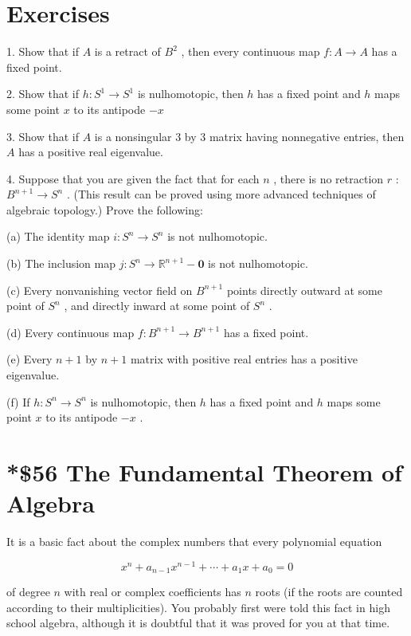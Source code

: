 \section*{Exercises}

1. Show that if \(A\) is a retract of \({B}^{2}\) , then every continuous map \(f : A \rightarrow  A\) has a fixed point.

2. Show that if \(h : {S}^{1} \rightarrow  {S}^{1}\) is nulhomotopic, then \(h\) has a fixed point and \(h\) maps some point \(x\) to its antipode \(- x\)

3. Show that if \(A\) is a nonsingular 3 by 3 matrix having nonnegative entries, then \(A\) has a positive real eigenvalue.

4. Suppose that you are given the fact that for each \(n\) , there is no retraction \(r\) : \({B}^{n + 1} \rightarrow  {S}^{n}\) . (This result can be proved using more advanced techniques of algebraic topology.) Prove the following:

(a) The identity map \(i : {S}^{n} \rightarrow  {S}^{n}\) is not nulhomotopic.

(b) The inclusion map \(j : {S}^{n} \rightarrow  {\mathbb{R}}^{n + 1} - \mathbf{0}\) is not nulhomotopic.

(c) Every nonvanishing vector field on \({B}^{n + 1}\) points directly outward at some point of \({S}^{n}\) , and directly inward at some point of \({S}^{n}\) .

(d) Every continuous map \(f : {B}^{n + 1} \rightarrow  {B}^{n + 1}\) has a fixed point.

(e) Every \(n + 1\) by \(n + 1\) matrix with positive real entries has a positive eigenvalue.

(f) If \(h : {S}^{n} \rightarrow  {S}^{n}\) is nulhomotopic, then \(h\) has a fixed point and \(h\) maps some point \(x\) to its antipode \(- x\) .

\section*{*\$56 The Fundamental Theorem of Algebra}

It is a basic fact about the complex numbers that every polynomial equation

\[
{x}^{n} + {a}_{n - 1}{x}^{n - 1} + \cdots  + {a}_{1}x + {a}_{0} = 0
\]

of degree \(n\) with real or complex coefficients has \(n\) roots (if the roots are counted according to their multiplicities). You probably first were told this fact in high school algebra, although it is doubtful that it was proved for you at that time.

